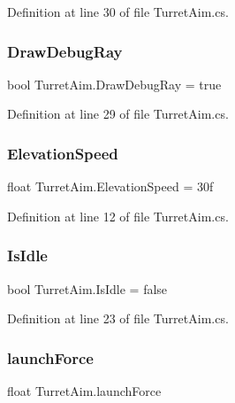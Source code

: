 Definition at line 30 of file Turret\+Aim.\+cs.

\mbox{\label{class_turret_aim_abaf205533086a821c7d21c405134d1c0}} 
\subsubsection{\texorpdfstring{Draw\+Debug\+Ray}{DrawDebugRay}}
{\footnotesize\ttfamily bool Turret\+Aim.\+Draw\+Debug\+Ray = true}



Definition at line 29 of file Turret\+Aim.\+cs.

\mbox{\label{class_turret_aim_ab6d11817dfff12c200f30a5b413922e1}} 
\subsubsection{\texorpdfstring{Elevation\+Speed}{ElevationSpeed}}
{\footnotesize\ttfamily float Turret\+Aim.\+Elevation\+Speed = 30f}



Definition at line 12 of file Turret\+Aim.\+cs.

\mbox{\label{class_turret_aim_aeda88b1a392e0ce59baf5720a641a0d5}} 
\subsubsection{\texorpdfstring{Is\+Idle}{IsIdle}}
{\footnotesize\ttfamily bool Turret\+Aim.\+Is\+Idle = false}



Definition at line 23 of file Turret\+Aim.\+cs.

\mbox{\label{class_turret_aim_a37ec381a26ff942b851d343cad70aae6}} 
\subsubsection{\texorpdfstring{launch\+Force}{launchForce}}
{\footnotesize\ttfamily float Turret\+Aim.\+launch\+Force}



